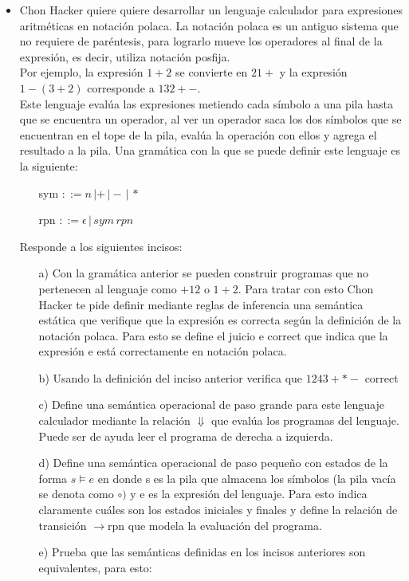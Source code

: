 \documentclass{article}
\begin{document}
    \begin{itemize}
        \item Chon Hacker quiere quiere desarrollar un lenguaje calculador para expresiones aritméticas en notación polaca. La notación polaca es un antiguo sistema que no requiere de paréntesis, para lograrlo mueve los operadores al final de la expresión, es decir, utiliza notación posfija.\\
        Por ejemplo, la expresión $1 + 2$ se convierte en $2 1 +$ y la expresión $1 - (3 + 2)$ corresponde a $1 3 2 + -$.\\
        Este lenguaje evalúa las expresiones metiendo cada símbolo a una pila hasta que se encuentra un operador, al ver un operador saca los dos símbolos que se encuentran en el tope de la pila, evalúa la operación con ellos y agrega el resultado a la pila.
        Una gramática con la que se puede definir este lenguaje es la siguiente:
        \begin{center}
            \begin{itemize}
                \item[ ] sym $::= n \,| + \,| - \,| \,*$
                \item[ ] rpn $::= \epsilon \,| \,sym \,rpn$
            \end{itemize}
        \end{center}
        Responde a los siguientes incisos:\\
        \begin{itemize}
            \item[a)] Con la gramática anterior se pueden construir programas que no pertenecen al lenguaje como $+1 2$ o $1 + 2$. Para tratar con esto Chon Hacker te pide definir mediante reglas de inferencia una semántica estática que verifique que la expresión es correcta según la definición de la notación polaca. Para esto se define el juicio e correct que indica que la expresión e está correctamente en notación polaca.
            \item[b)] Usando la definición del inciso anterior verifica que $1 2 4 3 + * -$ correct
            \item[c)] Define una semántica operacional de paso grande para este lenguaje calculador mediante la relación $\Downarrow$ que evalúa los programas del lenguaje. Puede ser de ayuda leer el programa de derecha a izquierda.
            \item[d)] Define una semántica operacional de paso pequeño con estados de la forma $s \models e$ en donde s es la pila que almacena los símbolos (la pila vacía se denota como $\circ)$ y e es la expresión del lenguaje. Para esto indica claramente cuáles son los estados iniciales y finales y define la relación de transición $\rightarrow$rpn que modela la evaluación del programa.
            \item[e)] Prueba que las semánticas definidas en los incisos anteriores son equivalentes, para esto:\\


\end{itemize}
\end{itemize}
\end{document}
